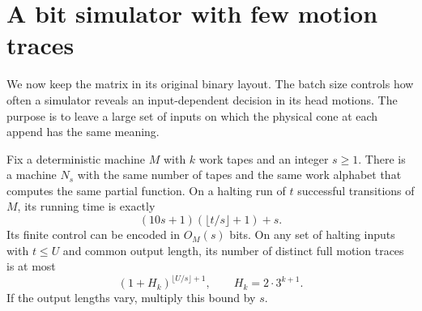 \section{A bit simulator with few motion traces}\label{sec:simulation}

We now keep the matrix in its original binary layout. The batch size
controls how often a simulator reveals an input-dependent decision in
its head motions. The purpose is to leave a large set of inputs on which
the physical cone at each append has the same meaning.

\begin{theorem}\label{thm:simulator}
Fix a deterministic machine $M$ with $k$ work tapes and an integer $s\ge1$.
There is a machine $N_s$ with the same number of tapes and the same work alphabet that computes the same partial function. On a halting run of $t$ successful transitions of $M$, its running time is exactly
\[
 (10s+1)(\lfloor t/s\rfloor+1)+s.
\]
Its finite control can be encoded in $O_M(s)$ bits. On any set of halting inputs with $t\le U$ and common output length, its number of distinct full motion traces is at most
\[
 (1+H_k)^{\lfloor U/s\rfloor+1},\qquad H_k=2\cdot3^{k+1}.
\]
If the output lengths vary, multiply this bound by $s$.
\end{theorem}

